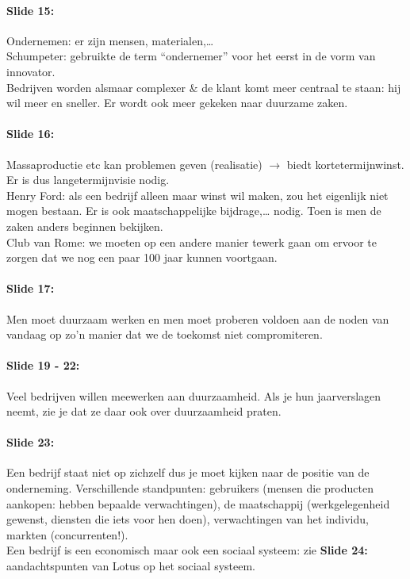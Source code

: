 \documentclass[10pt,a4paper]{report}
\begin{document}
\paragraph{Slide 15:} Ondernemen: er zijn mensen, materialen,…\\
Schumpeter: gebruikte de term ``ondernemer'' voor het eerst in de vorm van innovator. \\
Bedrijven worden alsmaar complexer $\&$ de klant komt meer centraal te staan: hij wil meer en sneller. Er wordt ook meer gekeken naar duurzame zaken. 

\paragraph{Slide 16:} Massaproductie etc kan problemen geven (realisatie) $\rightarrow$ biedt kortetermijnwinst. Er is dus langetermijnvisie nodig. \\
Henry Ford: als een bedrijf alleen maar winst wil maken, zou het eigenlijk niet mogen bestaan. Er is ook maatschappelijke bijdrage,… nodig. Toen is men de zaken anders beginnen bekijken.\\
Club van Rome: we moeten op een andere manier tewerk gaan om ervoor te zorgen dat we nog een paar 100 jaar kunnen voortgaan.

\paragraph{Slide 17:} Men moet duurzaam werken en men moet proberen voldoen aan de noden van vandaag op zo'n manier dat we de toekomst niet compromiteren.

\paragraph{Slide 19 - 22:} Veel bedrijven willen meewerken aan duurzaamheid. Als je hun jaarverslagen neemt, zie je dat ze daar ook over duurzaamheid praten.

\paragraph{Slide 23:} Een bedrijf staat niet op zichzelf dus je moet kijken naar de positie van de onderneming. Verschillende standpunten: gebruikers (mensen die producten aankopen: hebben bepaalde verwachtingen), de maatschappij (werkgelegenheid gewenst, diensten die iets voor hen doen), verwachtingen van het individu, markten (concurrenten!).\\
Een bedrijf is een economisch maar ook een sociaal systeem: zie \textbf{Slide 24:} aandachtspunten van Lotus op het sociaal systeem.
\end{document}
